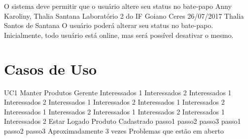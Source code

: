 \documentclass[versao=digital]{ifgoiano_ceres_tc_v2}
\begin{document}
{O sistema deve permitir que o usuário altere seu status no bate-papo}
{Anny Karoliny, Thalia Santana}
{Laboratório 2 do IF Goiano Ceres}
{26/07/2017}
{Thalia Santos de Santana}
{ O usuário poderá alterar seu status no bate-papo. Inicialmente, todo usuário está online, mas será possível desativar o mesmo.
}	

\section{Casos de Uso}

\casoDeUso
{UC1}
{Manter Produtos}
{Gerente}
{
Interessados 1 Interessados 2
Interessados 1 Interessados 2
Interessados 1 Interessados 2
Interessados 1 Interessados 2
Interessados 1 Interessados 2
Interessados 1 Interessados 2
Interessados 1 Interessados 2
}
{Estar Logado}
{Produto Cadastrado}
{
passo1
passo2
passo3
}
{
passo1
passo2
passo3
}
{Aproximadamente 3 vezes}
{
Problemas que estão em aberto
}
\end{document}
